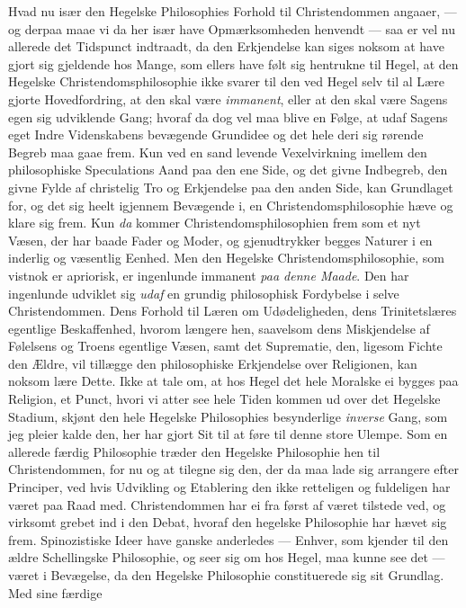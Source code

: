 \documentclass[12pt,a4paper]{book}
\newcommand{\apage}[1]{\marginnote{\footnotesize\textit{[#1]}}}
\begin{document}
Hvad nu især den Hegelske Philosophies Forhold til Christendommen angaaer,
--- og derpaa maae vi da her især have Opmærksomheden henvendt --- saa er
vel nu allerede det Tidspunct indtraadt, da den Erkjendelse kan siges
noksom at have gjort sig gjeldende hos Mange, som ellers have følt sig
hentrukne til Hegel, at den Hegelske Christendomsphilosophie ikke svarer til
den ved Hegel selv til al Lære gjorte Hovedfordring, at den skal være
\emph{immanent}, eller at den skal være Sagens egen sig udviklende Gang; \apage{19} hvoraf da
dog vel maa blive en Følge, at udaf Sagens eget Indre Videnskabens bevægende
Grundidee og det hele deri sig rørende Begreb maa gaae frem. Kun ved en sand
levende Vexelvirkning imellem den philosophiske Speculations Aand paa den
ene Side, og det givne Indbegreb, den givne Fylde af christelig Tro og
Erkjendelse paa den anden Side, kan Grundlaget for, og det sig heelt
igjennem Bevægende i, en Christendomsphilosophie hæve og klare sig frem. Kun
\emph{da} kommer Christendomsphilosophien frem som et nyt Væsen, der har baade
Fader og Moder, og gjenudtrykker begges Naturer i en inderlig og væsentlig
Eenhed. Men den Hegelske Christendomsphilosophie, som vistnok er apriorisk,
er ingenlunde immanent \emph{paa denne Maade}. Den har ingenlunde udviklet sig \emph{udaf}
en grundig philosophisk Fordybelse i selve Christendommen. Dens Forhold til
Læren om Udødeligheden, dens Trinitetslæres egentlige Beskaffenhed, hvorom
længere hen, saavelsom dens Miskjendelse af Følelsens og Troens egentlige
Væsen, samt det Suprematie, den, ligesom Fichte den Ældre, vil tillægge den
philosophiske Erkjendelse over Religionen, kan noksom lære Dette. Ikke at
tale om, at hos Hegel det hele Moralske ei bygges paa Religion, et Punct,
hvori vi atter see hele Tiden kommen ud over det Hegelske Stadium, skjønt
den hele Hegelske Philosophies besynderlige \emph{inverse} Gang, som jeg pleier
kalde den, her har gjort Sit til at føre til denne store Ulempe. Som en
allerede færdig Philosophie træder den Hegelske Philosophie hen til
Christendommen, for nu og at tilegne sig den, der da maa lade sig arrangere
efter Principer, ved hvis Udvikling og Etablering den ikke retteligen og
fuldeligen har været paa Raad med. Christendommen har ei fra først af været
tilstede ved, og virksomt grebet ind i den Debat, hvoraf den hegelske
Philosophie har hævet sig frem. Spinozistiske Ideer have ganske anderledes
--- Enhver, som kjender til den ældre Schellingske Philosophie, og seer sig
om hos Hegel, maa kunne see det --- været i Bevægelse, \apage{20} da den Hegelske
Philosophie constituerede sig sit Grundlag. Med sine færdige
\end{document}
